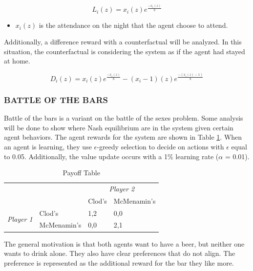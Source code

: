 \documentclass[letterpaper, 10 pt, conference]{ieeeconf}  %
\begin{document}
\begin{equation}
    L_{i}(z) = x_{i}(z)e^{\frac{-x_{i}(z)}{b}}
\end{equation}

\begin{itemize}
    \item $x_{i}(z)$ is the attendance on the night that the agent choose to attend.
\end{itemize}

Additionally, a difference reward with a counterfactual will be analyzed.  In this situation, the counterfactual is considering the system as if the agent had stayed at home.

\begin{equation}
    D_{i}(z) = x_{i}(z)e^{\frac{-x_{i}(z)}{b}}  - (x_{i} - 1)(z)e^{\frac{-(x_{i}(z)-1)}{b}}
\end{equation}

\subsubsection{BATTLE OF THE BARS}

Battle of the bars is a variant on the battle of the sexes problem.  Some analysis will be done to show where Nash equilibrium are in the system given certain agent behaviors.  The agent rewards for the system are shown in Table \ref{payoff_table}.  When an agent is learning, they use $\epsilon$-greedy selection to decide on actions with $\epsilon$ equal to 0.05.  Additionally, the value update occurs with a 1\% learning rate ($\alpha$ = 0.01).

\begin{table}[ht]
\centering
\begin{tabular}{@{}clll@{}}
 &  & \multicolumn{2}{c}{\textit{Player 2}} \\
 &  & Clod's & McMenamin's \\
\multirow{2}{*}{\textit{Player 1}} & Clod's & 1,2 & 0,0 \\
 & McMenamin's & 0,0 & 2,1
\end{tabular}
\caption{Payoff Table}
\label{payoff_table}
\end{table}


The general motivation is that both agents want to have a beer, but neither one wants to drink alone.  They also have clear preferences that do not align.  The preference is represented as the additional reward for the bar they like more.
\end{document}
